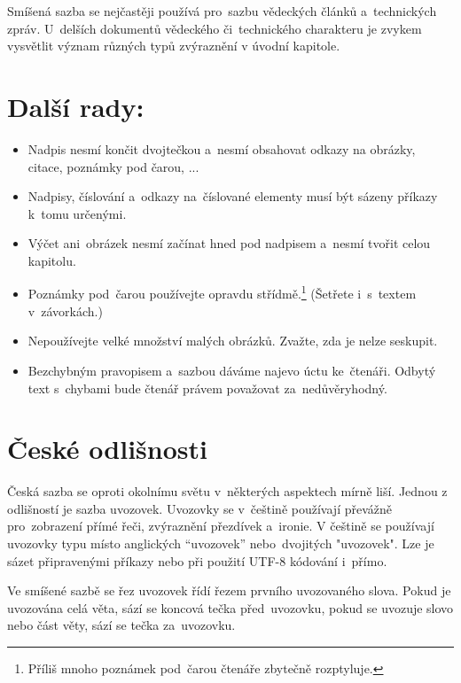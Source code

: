 \documentclass[10pt,a4paper,twocolumn]{article}
\begin{document}
Smíšená sazba se nejčastěji používá pro~sazbu vědeckých článků a~technických zpráv. U~delších dokumentů vědeckého či~technického charakteru je zvykem vysvětlit význam různých typů zvýraznění v úvodní kapitole.

\section{Další rady:}\label{sec:dalsirady}

\begin{itemize}\item Nadpis nesmí končit dvojtečkou a~nesmí obsahovat odkazy na obrázky, citace, poznámky pod čarou, ...

\item Nadpisy, číslování a~odkazy na~číslované elementy musí být sázeny příkazy k~tomu určenými.

\item Výčet ani~obrázek nesmí začínat hned pod nadpisem a~nesmí tvořit celou kapitolu.

\item Poznámky pod~čarou používejte opravdu střídmě.\footnote{Příliš mnoho poznámek pod~čarou čtenáře zbytečně rozptyluje.} (Šetřete i~s~textem v~závorkách.)

\item Nepoužívejte velké množství malých obrázků. Zvažte, zda je nelze seskupit.

\item Bezchybným pravopisem a~sazbou dáváme najevo úctu ke~čtenáři. Odbytý text s~chybami bude čtenář právem považovat za~nedůvěryhodný.\end{itemize}


\section{České odlišnosti}

Česká sazba se oproti okolnímu světu v~některých aspektech mírně liší. Jednou z odlišností je sazba uvozovek. Uvozovky se v~češtině používají převážně pro~zobrazení přímé řeči, zvýraznění přezdívek a~ironie. V češtině se používají uvozovky typu  místo anglických ``uvozovek'' nebo~dvojitých "uvozovek". Lze je sázet připravenými příkazy nebo při použití UTF-8 kódování i~přímo.

Ve smíšené sazbě se řez uvozovek řídí řezem prvního uvozovaného slova. Pokud je uvozována celá věta, sází se koncová tečka před~uvozovku, pokud se uvozuje slovo nebo část věty, sází se tečka za~uvozovku.
\end{document}
